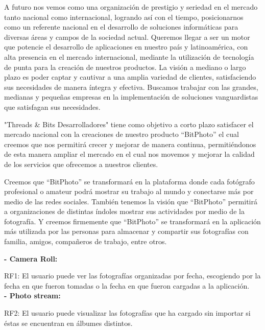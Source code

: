 \documentclass{memoria}
\begin{document}
A futuro nos vemos como una organización de prestigio y seriedad en el mercado tanto nacional como internacional, logrando así con el tiempo, posicionarnos como un referente nacional en el desarrollo de soluciones informáticas para diversas áreas y campos de la sociedad actual. Queremos llegar a ser un motor que potencie el desarrollo de aplicaciones en nuestro país y latinoamérica, con alta presencia en el mercado internacional, mediante la utilización de tecnología de punta para la creación de nuestros productos. La visión a mediano o largo plazo es poder captar y cautivar a una amplia variedad de clientes, satisfaciendo sus necesidades de manera íntegra y efectiva. Buscamos trabajar con las grandes, medianas y pequeñas empresas en la implementación de soluciones vanguardistas que satisfagan sus necesidades.

"Threads \& Bits Desarrolladores" tiene como objetivo a corto plazo satisfacer el mercado nacional con la creaciones de nuestro producto “BitPhoto” el cual creemos que nos permitirá crecer y mejorar de manera continua, permitiéndonos de esta manera ampliar el mercado en el cual nos movemos  y mejorar la calidad de los servicios que ofrecemos a nuestros clientes.

Creemos que “BitPhoto” se transformará en la plataforma donde cada fotógrafo profesional o amateur podrá mostrar su trabajo al mundo y conectarse más por medio de las redes sociales.  También tenemos la visión que “BitPhoto” permitirá a organizaciones de distintas índoles mostrar sus actividades por medio de la fotografía. Y creemos firmemente que “BitPhoto” se transformará en la aplicación más utilizada por las personas para almacenar y compartir sus fotografías con familia, amigos, compañeros de trabajo, entre otros.





\textbf{- Camera Roll:}

RF1: El usuario puede ver las fotografías organizadas por fecha, escogiendo por la fecha en que fueron tomadas o la fecha en que fueron cargadas a la aplicación.\\

\textbf{- Photo stream:}

RF2: El usuario puede visualizar las fotografías que ha cargado sin importar si éstas se encuentran en álbumes distintos.
\end{document}

